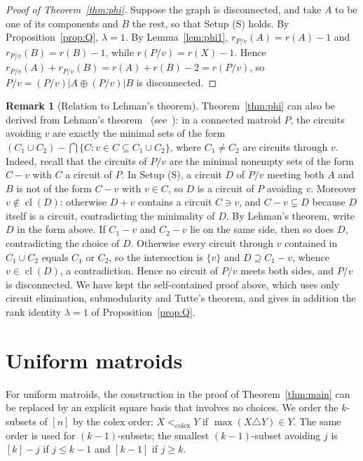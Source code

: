 \documentclass[11pt,a4paper]{article}
\theoremstyle{plain}
\theoremstyle{definition}
\newtheorem{remark}[theorem]{Remark}
\newcommand{\cl}{\operatorname{cl}}
\newcommand{\colex}{<_{\mathrm{colex}}}
\begin{document}
\begin{proof}[Proof of Theorem~\ref{thm:phi}]
Suppose the graph is disconnected, and take $A$ to be one of its components and $B$ the rest, so that Setup (S) holds. By Proposition~\ref{prop:Q}, $\lambda=1$. By Lemma~\ref{lem:phi1}, $r_{P/v}(A)=r(A)-1$ and $r_{P/v}(B)=r(B)-1$, while $r(P/v)=r(X)-1$. Hence $r_{P/v}(A)+r_{P/v}(B)=r(A)+r(B)-2=r(P/v)$, so $P/v=(P/v)|A\oplus(P/v)|B$ is disconnected.
\end{proof}

\begin{remark}[Relation to Lehman's theorem]\label{rem:lehman}
Theorem~\ref{thm:phi} can also be derived from Lehman's theorem~\cite{Le64} (see~\cite[Section~4.3]{Ox11}): in a connected matroid $P$, the circuits avoiding $v$ are exactly the minimal sets of the form $(C_1\cup C_2)-\bigcap\{C: v\in C\subseteq C_1\cup C_2\}$, where $C_1\ne C_2$ are circuits through $v$. Indeed, recall that the circuits of $P/v$ are the minimal nonempty sets of the form $C-v$ with $C$ a circuit of $P$. In Setup (S), a circuit $D$ of $P/v$ meeting both $A$ and $B$ is not of the form $C-v$ with $v\in C$, so $D$ is a circuit of $P$ avoiding $v$. Moreover $v\notin\cl(D)$: otherwise $D+v$ contains a circuit $C\ni v$, and $C-v\subsetneq D$ because $D$ itself is a circuit, contradicting the minimality of $D$. By Lehman's theorem, write $D$ in the form above. If $C_1-v$ and $C_2-v$ lie on the same side, then so does $D$, contradicting the choice of $D$. Otherwise every circuit through $v$ contained in $C_1\cup C_2$ equals $C_1$ or $C_2$, so the intersection is $\{v\}$ and $D\supseteq C_1-v$, whence $v\in\cl(D)$, a contradiction. Hence no circuit of $P/v$ meets both sides, and $P/v$ is disconnected. We have kept the self-contained proof above, which uses only circuit elimination, submodularity and Tutte's theorem, and gives in addition the rank identity $\lambda=1$ of Proposition~\ref{prop:Q}.
\end{remark}

\section{Uniform matroids}\label{sec:uniform}
For uniform matroids, the construction in the proof of Theorem~\ref{thm:main} can be replaced by an explicit square basis that involves no choices. We order the $k$-subsets of $[n]$ by the colex order: $X\colex Y$ if $\max(X\triangle Y)\in Y$. The same order is used for $(k-1)$-subsets; the smallest $(k-1)$-subset avoiding $j$ is $[k]-j$ if $j\le k-1$ and $[k-1]$ if $j\ge k$.
\end{document}
